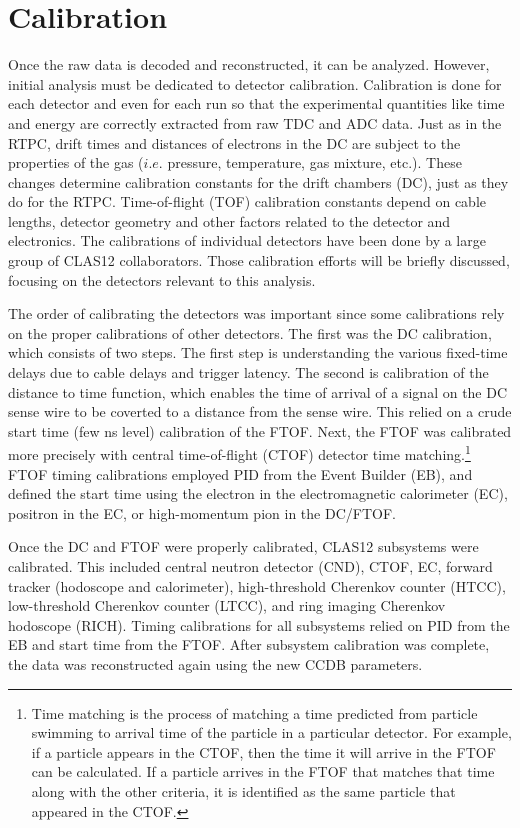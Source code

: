 \section{Calibration}
Once the raw data is decoded and reconstructed, it can be analyzed. However, initial analysis must be dedicated to detector calibration. Calibration is done for each detector and even for each run so that the experimental quantities like time and energy are correctly extracted from raw TDC and ADC data. Just as in the RTPC, drift times and distances of electrons in the DC are subject to the properties of the gas ($i.e.$ pressure, temperature, gas mixture, etc.). These changes determine calibration constants for the drift chambers (DC), just as they do for the RTPC. Time-of-flight (TOF) calibration constants depend on cable lengths, detector geometry and other factors related to the detector and electronics. The calibrations of individual detectors have been done by a large group of CLAS12 collaborators. Those calibration efforts will be briefly discussed, focusing on the detectors relevant to this analysis.

The order of calibrating the detectors was important since some calibrations rely on the proper calibrations of other detectors. The first was the DC calibration, which consists of two steps. The first step is understanding the various fixed-time delays due to cable delays and trigger latency. The second is calibration of the distance to time function, which enables the time of arrival of a signal on the DC sense wire to be coverted to a distance from the sense wire. This relied on a crude start time (few ns level) calibration of the FTOF. Next, the FTOF was calibrated more precisely with central time-of-flight (CTOF) detector time matching.\footnote{Time matching is the process of matching a time predicted from particle swimming to arrival time of the particle in a particular detector. For example, if a particle appears in the CTOF, then the time it will arrive in the FTOF can be calculated. If a particle arrives in the FTOF that matches that time along with the other criteria, it is identified as the same particle that appeared in the CTOF.} FTOF timing calibrations employed PID from the Event Builder (EB), and defined the start time using the electron in the electromagnetic calorimeter (EC), positron in the EC, or high-momentum pion in the DC/FTOF. 

Once the DC and FTOF were properly calibrated, CLAS12 subsystems were calibrated. This included central neutron detector (CND), CTOF, EC, forward tracker (hodoscope and calorimeter), high-threshold Cherenkov counter (HTCC), low-threshold Cherenkov counter (LTCC), and ring imaging Cherenkov hodoscope (RICH). Timing calibrations for all subsystems relied on PID from the EB and start time from the FTOF. After subsystem calibration was complete, the data was reconstructed again using the new CCDB parameters.

